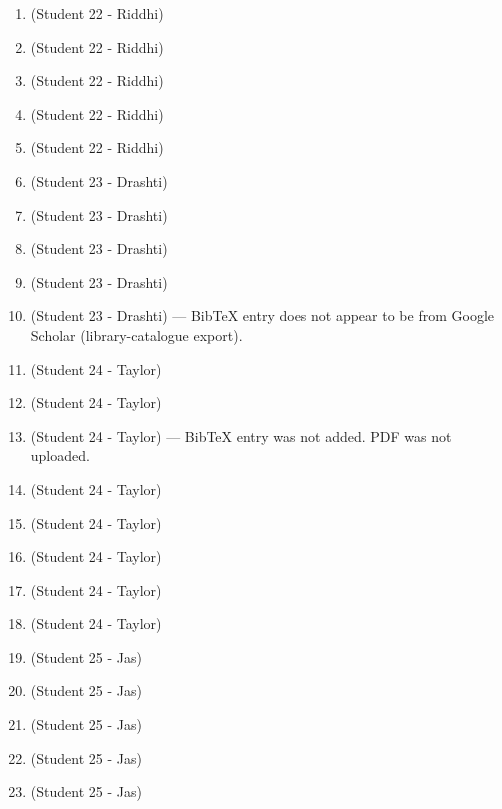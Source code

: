 \begin{enumerate}[label=\#\arabic*]
The same is true for the two entries that follow it in refs.bib (\texttt{11489265} and \texttt{springer\_10.1007/3-540-39118-5\_2}), which are not cited in this list.
Visit \url{scholar.google.com} to obtain the correct Bibtex entries.
Two of your entries were also removed for being a duplicate.
\item \cite{sakata1978general} (Student 22 - Riddhi)
\item \cite{scheinerman2001determining} (Student 22 - Riddhi)
\item \cite{sakata1988finding} (Student 22 - Riddhi)
\item \cite{sakata1981determining} (Student 22 - Riddhi)
\item \cite{pudwell2014debruijn} (Student 22 - Riddhi)
\item \cite{anisiu2006twodimensional} (Student 23 - Drashti)
\item \cite{gerlach2026shorthand} (Student 23 - Drashti)
\item \cite{tinker2017debruijn} (Student 23 - Drashti)
\item \cite{stojkovic2019pseudorandom} (Student 23 - Drashti)
\item \cite{alma992340821905151} (Student 23 - Drashti) --- BibTeX entry does not appear to be from Google Scholar (library-catalogue export).
\item \cite{ivanyi1988construction} (Student 24 - Taylor)
\item \cite{paterson1996new} (Student 24 - Taylor)
\item \cite{costa2019tour} (Student 24 - Taylor) --- BibTeX entry was not added. PDF was not uploaded.
\item \cite{carey2025universal} (Student 24 - Taylor)
\item \cite{hurlbert1990universal} (Student 24 - Taylor)
\item \cite{west2005comparison} (Student 24 - Taylor)
\item \cite{roig2024applying} (Student 24 - Taylor)
\item \cite{chee2019binary} (Student 24 - Taylor)
\item \cite{etzion2025bruijn} (Student 25 - Jas)
\item \cite{horan2016locating} (Student 25 - Jas)
\item \cite{mitchell1995aperiodic} (Student 25 - Jas)
\item \cite{luke1988sequences} (Student 25 - Jas)
\item \cite{isaak2002constructions} (Student 25 - Jas)

\end{enumerate}
